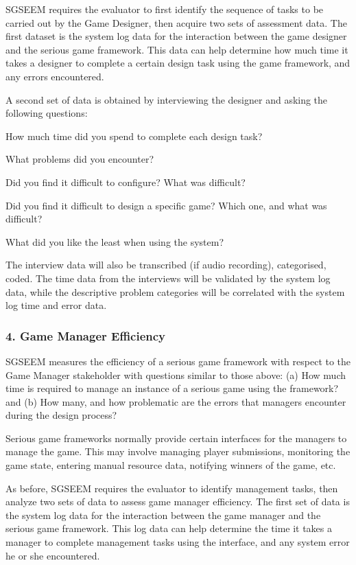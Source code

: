 \documentclass{sigchi}
\begin{document}
SGSEEM requires the evaluator to first identify the sequence of tasks to be carried out by
the Game Designer, then acquire two sets of assessment data.
The first dataset is the system log data for the interaction between the game designer
and the serious game framework. This data can help determine how much 
time it takes a designer to complete a certain design task using the game
framework, and any errors encountered. 

A second set of data is obtained by interviewing the designer and asking the following questions:
\begin{compactitem}
\item How much time did you spend to complete each design task?
\item What problems did you encounter?
\item Did you find it difficult to configure? What was difficult?
\item Did you find it difficult to design a specific game? Which one, and what was difficult?
\item What did you like the least when using the system?
\end{compactitem}

The interview data will also be transcribed (if audio recording), categorised, coded. The time data from the interviews will be validated by the system log data, while the descriptive problem categories will be correlated with the system log time and error data.

\subsubsection{4. Game Manager Efficiency}

SGSEEM measures the efficiency of a serious game framework with respect to the Game
Manager stakeholder with questions similar to those above: (a) How much time is
required to manage an instance of a serious game using the framework? and (b) How many,
and how problematic are the errors that managers encounter during the design process?

Serious game frameworks normally provide certain interfaces for the managers to manage the
game. This may involve managing player submissions, monitoring the game state, entering
manual resource data, notifying winners of the game, etc.

As before, SGSEEM requires the evaluator to identify management tasks, then
analyze two sets of data to assess game manager efficiency. The
first set of data is the system log data for the interaction between
the game manager and the serious game framework. This log data can help 
determine the time it takes a manager to complete
management tasks using the interface, and any system error he or she
encountered. 
\end{document}

